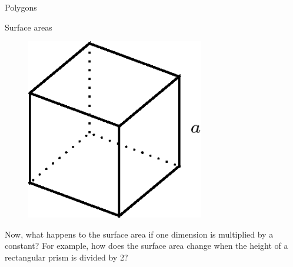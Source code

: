 \begin{exercises}{Polygons}
\begin{exercises}{Surface areas }
\begin{enumerate}[noitemsep, label=\textbf{\arabic*}. ]
    \setcounter{subfigure}{0}


	\begin{figure}[H] %
    \begin{center}
    \label{m39357*id63117!!!underscore!!!media}\label{m39357*id63117!!!underscore!!!printimage}\includegraphics[height=300px]{col11306.imgs/m39357_MG10C14_007.png} %
        
      \vspace{2pt}
    \vspace{.1in}
    
    \end{center}

 \end{figure}   

    \addtocounter{footnote}{-0}
            \end{enumerate}
        
        

        \label{m39357*id63133}Now, what happens to the surface area if one dimension is multiplied by a constant? For example, how does the surface area change when the height of a rectangular prism is divided by 2?\par 
 \label{m39357*is08324}       
    \setcounter{subfigure}{0}



\end{exercises}
\end{exercises}
